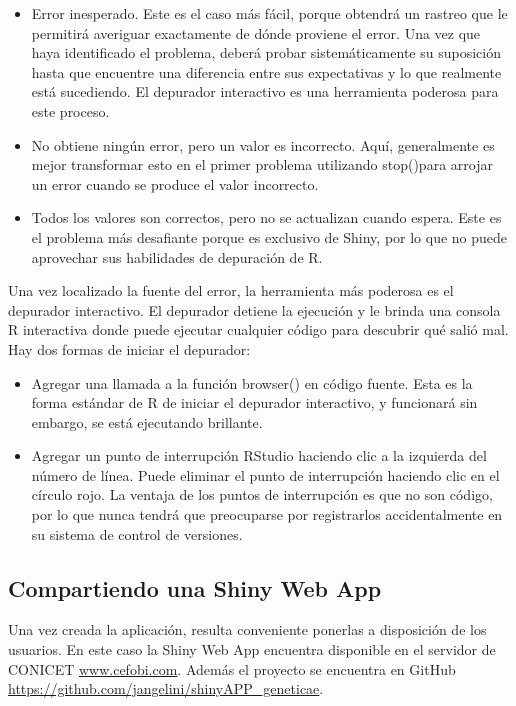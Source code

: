 \begin{itemize}
\item Error inesperado. Este es el caso más fácil, porque obtendrá un rastreo que le permitirá averiguar exactamente de dónde proviene el error. Una vez que haya identificado el problema, deberá probar sistemáticamente su suposición hasta que encuentre una diferencia entre sus expectativas y lo que realmente está sucediendo. El depurador interactivo es una herramienta poderosa para este proceso.
\item No obtiene ningún error, pero un valor es incorrecto. Aquí, generalmente es mejor transformar esto en el primer problema utilizando stop()para arrojar un error cuando se produce el valor incorrecto.
\item Todos los valores son correctos, pero no se actualizan cuando espera. Este es el problema más desafiante porque es exclusivo de Shiny, por lo que no puede aprovechar sus habilidades de depuración de R.

\end{itemize}


Una vez localizado la fuente del error, la herramienta más poderosa es el depurador interactivo. El depurador detiene la ejecución y le brinda una consola R interactiva donde puede ejecutar cualquier código para descubrir qué salió mal. Hay dos formas de iniciar el depurador:

\begin{itemize}
\item Agregar una llamada a la función browser() en código fuente. Esta es la forma estándar de R de iniciar el depurador interactivo, y funcionará sin embargo, se está ejecutando brillante.
\item Agregar un punto de interrupción RStudio haciendo clic a la izquierda del número de línea. Puede eliminar el punto de interrupción haciendo clic en el círculo rojo. La ventaja de los puntos de interrupción es que no son código, por lo que nunca tendrá que preocuparse por registrarlos accidentalmente en su sistema de control de versiones.
\end{itemize}





\subsection{Compartiendo una Shiny Web App}

Una vez creada la aplicación, resulta conveniente ponerlas a disposición de los usuarios. En este caso la Shiny Web App encuentra disponible en el servidor de CONICET \url{www.cefobi.com}. Además el proyecto se encuentra en GitHub \url{https://github.com/jangelini/shinyAPP_geneticae}. 
